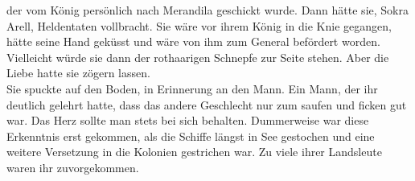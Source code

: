 der vom König persönlich nach Merandila geschickt wurde. Dann hätte sie, Sokra Arell, Heldentaten 
vollbracht. Sie wäre vor ihrem König in die Knie gegangen, hätte seine Hand geküsst und wäre von 
ihm zum General befördert worden. Vielleicht würde sie dann der rothaarigen Schnepfe zur Seite 
stehen. Aber die Liebe hatte sie zögern lassen.\\
Sie spuckte auf den Boden, in Erinnerung an den Mann. Ein Mann, der ihr deutlich gelehrt hatte, dass 
das andere Geschlecht nur zum saufen und ficken gut war. Das Herz sollte man stets bei sich 
behalten. Dummerweise war diese Erkenntnis erst gekommen, als die Schiffe längst in See gestochen  
und eine weitere Versetzung in die Kolonien gestrichen war. Zu viele ihrer Landsleute waren ihr 
zuvorgekommen.\\


